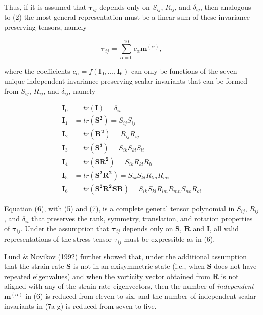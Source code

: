Thus, if it is assumed that $\mathbf{\tau}_{ij}$  depends only on $S_{ij}$, $R_{ij}$, and $\delta_{ij}$, then analogous to (2) the most general representation must be a linear sum of these invariance-preserving tensors, namely

%
\begin{equation}
	\label{E:23}
		\mathbf{\tau}_{ij} = \sum_{\alpha=0}^{10} c_{\alpha} \mathbf{m}^{(\alpha)},
\end{equation}
%
%   

where the coefficients $c_{\alpha} = f(\mathbf{I}_0, \ldots, \mathbf{I}_6)$  can only be functions of the seven unique independent invariance-preserving scalar invariants that can be formed from $S_{ij}$, $R_{ij}$, and $\delta_{ij}$, namely

%
\begin{subequations}
\begin{align}
	\label{E:24}
		\mathbf{I}_{0} &= tr(\mathbf{I})   = \delta_{ii} \\
		\mathbf{I}_{1} &= tr(\mathbf{S^2}) = S_{ij}S_{ij} \\
		\mathbf{I}_{2} &= tr(\mathbf{R^2}) = R_{ij}R_{ij} \\
		\mathbf{I}_{3} &= tr(\mathbf{S^3}) = S_{ik}S_{kl}S_{li} \\
		\mathbf{I}_{4} &= tr(\mathbf{SR^2}) = S_{ik}R_{kl}R_{li} \\ 
		\mathbf{I}_{5} &= tr(\mathbf{S^2R^2}) = S_{ik}S_{kl}R_{lm}R_{mi} \\ 
		\mathbf{I}_{6} &= tr(\mathbf{S^2R^2SR}) = S_{ik}S_{kl}R_{lm}R_{mn}S_{no}R_{oi} 
\end{align}
\end{subequations}
%
%    

Equation (6), with (5) and (7), is a complete general tensor polynomial in $S_{ij}$, $R_{ij}$, and $\delta_{ii}$ that preserves the rank, symmetry, translation, and rotation properties of $\mathbf{\tau}_{ij}$.  Under the assumption that $\mathbf{\tau}_{ij}$  depends only on $\mathbf{S}$, $\mathbf{R}$ and $\mathbf{I}$, all valid representations of the stress tensor $\tau_{ij}$  must be expressible as in (6).

Lund $\&$ Novikov (1992) further showed that, under the additional assumption that the strain rate $\mathbf{S}$ is not in an axisymmetric state (i.e., when $\mathbf{S}$ does not have repeated eigenvalues) and when the vorticity vector obtained from $\mathbf{R}$ is not aligned with any of the strain rate eigenvectors, then the number of \textit{independent} $\mathbf{m}^{(\alpha)}$ in (6) is reduced from eleven to six, and the number of independent scalar invariants in (7a-g) is reduced from seven to five. 


